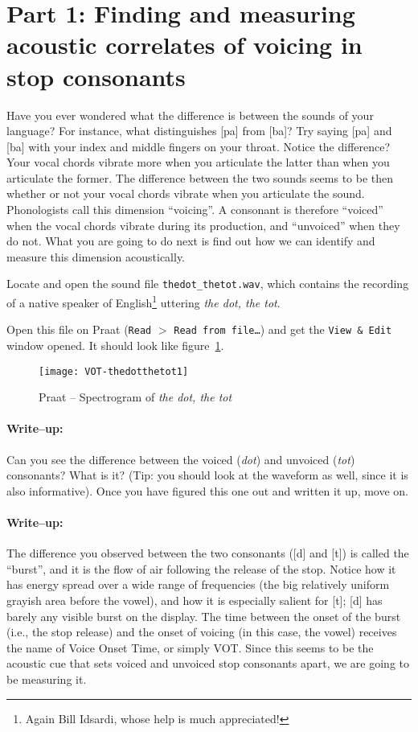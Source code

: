 \documentclass{article}
\newcommand{\soft}[1]{\textsf{#1}}
\newcommand{\filefmat}[1]{\texttt{#1}}
\newcommand{\softmenu}[1]{\texttt{#1}}
\newcommand{\Praat}{\soft{Praat}}
\begin{document}
%
%

\section{Part 1: Finding and measuring acoustic correlates of voicing in stop consonants}

Have you ever wondered what the difference is between the sounds of your language? For instance, what distinguishes [pa] from [ba]? Try saying [pa] and [ba] with your index and middle fingers on your throat. Notice the difference? Your vocal chords vibrate more when you articulate the latter than when you articulate the former. The difference between the two sounds seems to be then whether or not your vocal chords vibrate when you articulate the sound. Phonologists call this dimension ``voicing''. A consonant is therefore ``voiced'' when the vocal chords vibrate during its production, and ``unvoiced'' when they do not. What you are going to do next is find out how we can identify and measure this dimension acoustically.

Locate and open the sound file \filefmat{thedot\_thetot.wav}, which contains the recording of a native speaker of English\footnote{Again Bill Idsardi, whose help is much appreciated!} uttering \emph{the dot, the tot}.

Open this file on \Praat{} (\softmenu{Read} $>$ \softmenu{Read from file\ldots}) and get the \softmenu{View \& Edit} window opened. It should look like figure~\ref{step1VOT}.

\begin{figure}[!tbp]
\caption{\Praat{} -- Spectrogram of \emph{the dot, the tot}}
\label{step1VOT}
	\begin{center}
		\texttt{[image: VOT-thedotthetot1]}
	\end{center}
\end{figure}

\paragraph{Write--up:} Can you see the difference between the voiced (\emph{dot}) and unvoiced (\emph{tot}) consonants? What is it? (Tip: you should look at the waveform as well, since it is also informative). Once you have figured this one out and written it up, move on.

\paragraph{Write--up:} The difference you observed between the two consonants ([d] and [t]) is called the ``burst'', and it is the flow of air following the release of the stop. Notice how it has energy spread over a wide range of frequencies (the big relatively uniform grayish area before the vowel), and how it is especially salient for [t]; [d] has barely any visible burst on the display. The time between the onset of the burst (i.e., the stop release) and the onset of voicing (in this case, the vowel) receives the name of Voice Onset Time, or simply VOT. Since this seems to be the acoustic cue that sets voiced and unvoiced stop consonants apart, we are going to be measuring it.
\end{document}
